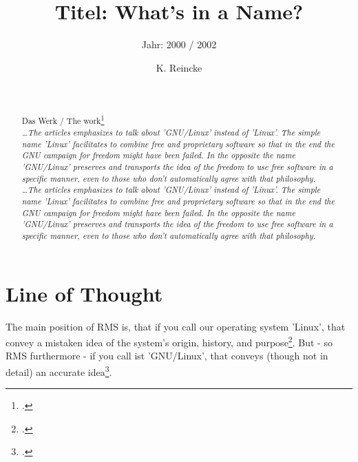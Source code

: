 \documentclass[DIV=calc,BCOR=5mm,11pt,headings=small,oneside,abstract=true, toc=bib]{scrartcl}
\begin{document}

\titlehead{Literaturexzerpt}
\subject{Autor(en): Stallman / Stallman2000a}
\title{Titel: What's in a Name?}
\subtitle{Jahr: 2000 / 2002 }
\author{K. Reincke}

\maketitle

\begin{abstract}
\noindent
\cite[(in:)][]{StaGay2002a} \\
\noindent
\cite[(ist:)][]{Stallman2000a} \\
Das Werk / The work\footcite[][]{Stallman2000a} \\
\noindent \itshape
\ldots The articles emphasizes to talk about 'GNU/Linux' instead of 'Linux'. The
simple name 'Linux' facilitates to combine free and proprietary software so that
in the end the GNU campaign for freedom might have been failed. In the opposite
the name 'GNU/Linux' preserves and transports the idea of the freedom to use
free software in a specific manner, even to those who don't automatically agree
with that philosophy.
\\
\noindent
\ldots The articles emphasizes to talk about 'GNU/Linux' instead of 'Linux'. The
simple name 'Linux' facilitates to combine free and proprietary software so that
in the end the GNU campaign for freedom might have been failed. In the opposite
the name 'GNU/Linux' preserves and transports the idea of the freedom to use
free software in a specific manner, even to those who don't automatically agree
with that philosophy.
\end{abstract}
\footnotesize
\normalsize

\section{Line of Thought}

The main position of RMS is, that \glqq{}if you call our operating system
'Linux', that convey a mistaken idea of the system's origin, history, and
purpose\grqq{}\footcite[cf][51]{Stallman2000a}. But - so RMS furthermore -
\glqq{}if you call ist 'GNU/Linux', that conveys (though not in detail)
an accurate idea\grqq{}\footcite[cf][51]{Stallman2000a}.
\end{document}
